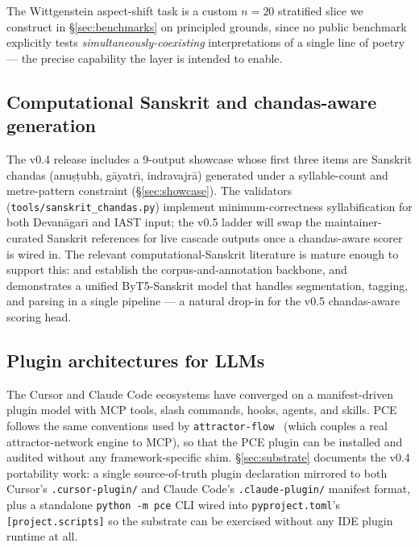 The Wittgenstein aspect-shift task is a custom $n\!=\!20$ stratified slice we construct in \S\ref{sec:benchmarks} on principled grounds, since no public benchmark explicitly tests \emph{simultaneously-coexisting} interpretations of a single line of poetry --- the precise capability the  layer is intended to enable.

\subsection{Computational Sanskrit and chandas-aware generation}

The v0.4 release includes a 9-output showcase whose first three items are Sanskrit chandas (anu\d{s}\d{t}ubh, g\=ayatr\={\i}, indravajr\=a) generated under a syllable-count and metre-pattern constraint (\S\ref{sec:showcase}). The validators (\texttt{tools/sanskrit\_chandas.py}) implement minimum-correctness syllabification for both Devan\=agar\={\i} and IAST input; the v0.5 ladder will swap the maintainer-curated Sanskrit references for live cascade outputs once a chandas-aware scorer is wired in. The relevant computational-Sanskrit literature is mature enough to support this: \citet{HellwigEtAl2023VedicSanskritDependencyParsing} and \citet{HellwigBiagetti2025SanskritSembank} establish the corpus-and-annotation backbone, and \citet{NehrdichEtAl2024ByT5Sanskrit} demonstrates a unified ByT5-Sanskrit model that handles segmentation, tagging, and parsing in a single pipeline --- a natural drop-in for the v0.5 chandas-aware scoring head.

\subsection{Plugin architectures for LLMs}

The Cursor and Claude Code ecosystems have converged on a manifest-driven plugin model with MCP tools, slash commands, hooks, agents, and skills. PCE follows the same conventions used by \texttt{attractor-flow}~\citep{AttractorFlow2025} (which couples a real attractor-network engine to MCP), so that the PCE plugin can be installed and audited without any framework-specific shim. \S\ref{sec:substrate} documents the v0.4 portability work: a single source-of-truth plugin declaration mirrored to both Cursor's \texttt{.cursor-plugin/} and Claude Code's \texttt{.claude-plugin/} manifest format, plus a standalone \texttt{python -m pce} CLI wired into \texttt{pyproject.toml}'s \texttt{[project.scripts]} so the substrate can be exercised without any IDE plugin runtime at all.
